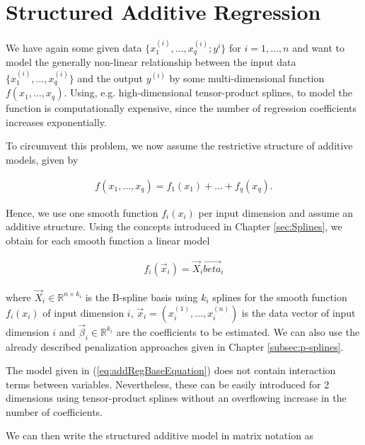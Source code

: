 \documentclass[10pt,a4paper]{report}
\begin{document}
\section{Structured Additive Regression} \label{sec:STAR}

We have again some given data $\{x^{(i)}_{1}, \dots, x^{(i)}_{q}; y^i\}$ for $i = 1, \dots, n$ and want to model the generally non-linear relationship between the input data $\{x^{(i)}_{1}, \dots, x^{(i)}_{q}\}$ and the output $y^{(i)}$ by some multi-dimensional function $f(x_1, \dots, x_q)$.  Using, e.g. high-dimensional tensor-product splines, to model the function is computationally expensive, since the number of regression coefficients increases exponentially.

To circumvent this problem, we now assume the restrictive structure of additive models, given by

\begin{align} \label{eq:addRegBaseEquation}
	f(x_1, \dots, x_q) = f_1(x_1) + \dots + f_q(x_q).
\end{align}

Hence, we use one smooth function $f_i(x_i)$ per input dimension and assume an additive structure. \cite{fahrmeir2013regression} Using the concepts introduced in Chapter \ref{sec:Splines}, we obtain for each smooth function a linear model

\begin{align}
	f_i(\vec{x}_i) = \vec{X}_i \vec{beta}_i
\end{align}

where $\vec{X}_i \in \mathbb R^{n \times k_i}$ is the B-spline basis using $k_i$ splines for the smooth function $f_i(x_i)$ of input dimension $i$, $\vec{x}_i = (x_i^{(1)}, \dots, x_i^{(n)})$ is the data vector of input dimension $i$ and $\vec{\beta}_i \in \mathbb R^{k_i}$ are the coefficients to be estimated. We can also use the already described penalization approaches given in Chapter \ref{subsec:p-splines}. 

The model given in (\ref{eq:addRegBaseEquation}) does not contain interaction terms between variables. Nevertheless, these can be easily introduced for 2 dimensions using tensor-product splines without an overflowing increase in the number of coefficients.

We can then write the structured additive model in matrix notation as 
\end{document}
